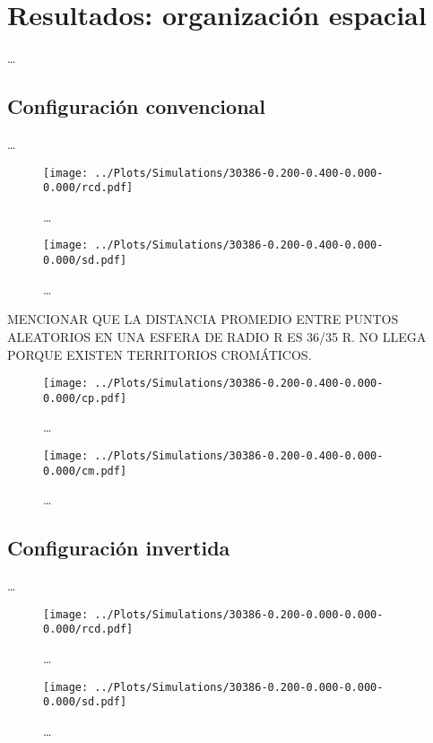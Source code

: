 \chapter{Resultados: organización espacial}
\label{cap:results}

\dots

\section{Configuración convencional}

\dots

\begin{figure}
  \centering
  \texttt{[image: ../Plots/Simulations/30386-0.200-0.400-0.000-0.000/rcd.pdf]}
  \caption{\dots}
  \label{fig:rcd_c}
\end{figure}

\begin{figure}
  \centering
  \texttt{[image: ../Plots/Simulations/30386-0.200-0.400-0.000-0.000/sd.pdf]}
  \caption{\dots}
  \label{fig:sd_c}
\end{figure}

MENCIONAR QUE LA DISTANCIA PROMEDIO ENTRE PUNTOS ALEATORIOS EN UNA ESFERA DE RADIO R ES 36/35 R. NO LLEGA PORQUE EXISTEN TERRITORIOS CROMÁTICOS.

\begin{figure}
  \centering
  \texttt{[image: ../Plots/Simulations/30386-0.200-0.400-0.000-0.000/cp.pdf]}
  \caption{\dots}
  \label{fig:cp_c}
\end{figure}

\begin{figure}
  \centering
  \texttt{[image: ../Plots/Simulations/30386-0.200-0.400-0.000-0.000/cm.pdf]}
  \caption{\dots}
  \label{fig:cm_c}
\end{figure}

\section{Configuración invertida}

\dots

\begin{figure}
  \centering
  \texttt{[image: ../Plots/Simulations/30386-0.200-0.000-0.000-0.000/rcd.pdf]}
  \caption{\dots}
  \label{fig:rcd_i}
\end{figure}

\begin{figure}
  \centering
  \texttt{[image: ../Plots/Simulations/30386-0.200-0.000-0.000-0.000/sd.pdf]}
  \caption{\dots}
  \label{fig:sd_i}
\end{figure}

